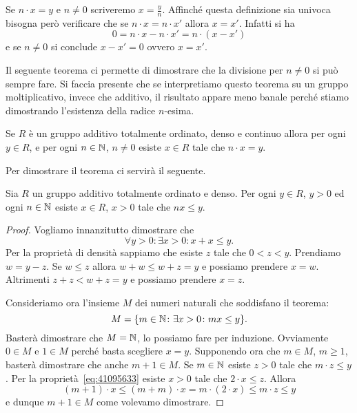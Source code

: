 Se $n\cdot x = y$ e $n\neq 0$ scriveremo $x=\frac y n$. 
Affinché questa definizione sia univoca bisogna però verificare che 
se $n\cdot x = n\cdot x'$ allora $x=x'$.
Infatti si ha 
\[
  0 = n\cdot x - n\cdot x' = n\cdot (x-x')
\]
e se $n\neq 0$ si conclude $x-x'=0$ ovvero $x=x'$.

Il seguente teorema ci permette di dimostrare che la divisione per $n\neq 0$ 
si può sempre fare.
Si faccia presente che se interpretiamo questo teorema su un 
gruppo moltiplicativo, invece che additivo, il risultato
appare meno banale perché 
stiamo dimostrando l'esistenza della radice $n$-esima.

\begin{theorem}[divisibilità]
\label{th:divisibile}%
Se $R$ è un gruppo additivo totalmente ordinato, denso e continuo
allora per ogni $y\in R$, e per ogni $n\in {\mathbb N}$, $n\neq 0$ 
esiste $x\in R$ tale che $n\cdot x = y$.
\end{theorem}
%
Per dimostrare il teorema ci servirà il seguente.
%
\begin{lemma}
  \label{lm:numeri_piccoli}%
Sia $R$ un gruppo additivo totalmente ordinato e denso.
Per ogni $y\in R$, $y>0$ ed ogni $n\in {\mathbb N}$ esiste $x\in R$, 
$x>0$ tale che $nx\le y$.
\end{lemma}
%
\begin{proof}
Vogliamo innanzitutto dimostrare che 
\begin{equation}\label{eq:41095633}
  \forall y>0 \colon \exists x>0 \colon x+x \le y.
\end{equation}
Per la proprietà di densità sappiamo che esiste $z$ tale che 
$0<z<y$. 
Prendiamo $w=y-z$. Se $w\le z$ allora $w+w\le w+z=y$ e possiamo prendere $x=w$.
Altrimenti $z+z < w+z = y$ e possiamo prendere $x=z$.

Consideriamo ora l'insieme $M$ dei numeri naturali che 
soddisfano il teorema:
\[
  M = {\left\{ m\in {\mathbb N}\colon \exists x>0\colon mx\le y \right\}}.
\]
Basterà dimostrare che $M={\mathbb N}$, lo possiamo fare per induzione.
Ovviamente $0\in M$ e $1\in M$ perché basta scegliere $x=y$.
Supponendo ora che $m\in M$, $m\ge 1$, basterà dimostrare che anche $m+1\in M$.
Se $m\in {\mathbb N}$ esiste $z>0$ tale che $m\cdot z\le y$.
Per la proprietà~\eqref{eq:41095633} esiste $x>0$ tale che $2\cdot x\le z$.
Allora 
\[
  (m+1)\cdot x 
  \le (m+m)\cdot x 
  = m\cdot(2\cdot x)
  \le m\cdot z \le y
\]
e dunque $m+1\in M$ come volevamo dimostrare.
\end{proof}
